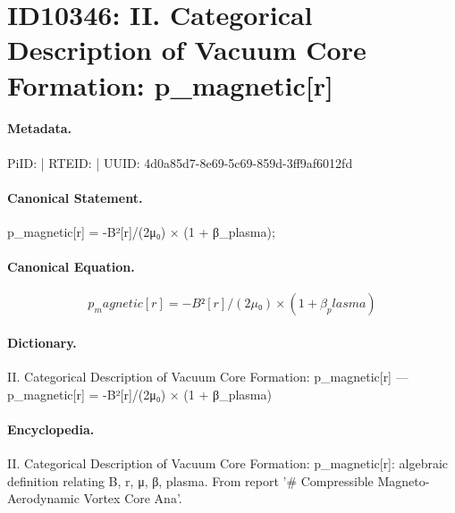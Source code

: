\section*{ID10346: II. Categorical Description of Vacuum Core Formation: p\_magnetic[r]}
\paragraph{Metadata.}
PiID:  | RTEID:  | UUID: 4d0a85d7-8e69-5c69-859d-3ff9af6012fd

\paragraph{Canonical Statement.}
p\_magnetic[r] = -B²[r]/(2μ₀) × (1 + β\_plasma);

\paragraph{Canonical Equation.}
\[
p_magnetic[r] = -B²[r]/(2μ₀) × (1 + β_plasma)
\]

\paragraph{Dictionary.}
II. Categorical Description of Vacuum Core Formation: p\_magnetic[r] — p\_magnetic[r] = -B²[r]/(2μ₀) × (1 + β\_plasma)

\paragraph{Encyclopedia.}
II. Categorical Description of Vacuum Core Formation: p\_magnetic[r]: algebraic definition relating B, r, μ, β, plasma. From report '\# Compressible Magneto-Aerodynamic Vortex Core Ana'.
